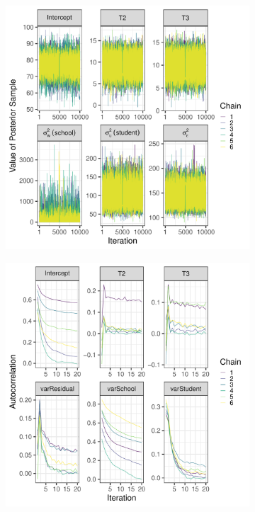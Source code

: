 \documentclass[a4paper]{article}
\begin{document}
\begin{figure}[!ht]
	\centering
	\begin{subfigure}{.5\textwidth}
		\centering
		\includegraphics[width=\linewidth]{traceplotsExperimental.pdf}
	\end{subfigure}%
	\begin{subfigure}{.5\textwidth}
		\centering
		\includegraphics[width=\linewidth]{autocorrelationExperimental}

\end{subfigure}
\end{figure}
\end{document}
